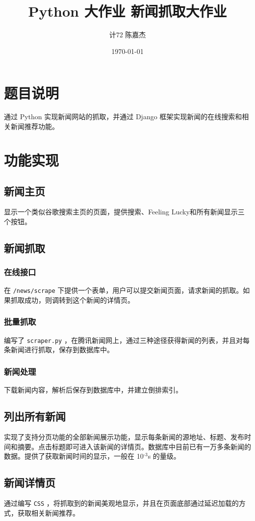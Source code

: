 \documentclass[11pt]{article}
\author{计72 陈嘉杰}
\date{\today}
\title{Python 大作业 新闻抓取大作业}
\begin{document}
\maketitle
\tableofcontents

\section{题目说明}
\label{sec:orga750e06}
通过 Python 实现新闻网站的抓取，并通过 Django 框架实现新闻的在线搜索和相关新闻推荐功能。

\section{功能实现}
\label{sec:orge7c0fa5}
\subsection{新闻主页}
\label{sec:org84926a9}
显示一个类似谷歌搜索主页的页面，提供搜索、Feeling Lucky和所有新闻显示三个按钮。
\subsection{新闻抓取}
\label{sec:org071694a}
\subsubsection{在线接口}
\label{sec:org5a70e2e}
在 \texttt{/news/scrape} 下提供一个表单，用户可以提交新闻页面，请求新闻的抓取。如果抓取成功，则调转到这个新闻的详情页。
\subsubsection{批量抓取}
\label{sec:org731a6b0}
编写了 \texttt{scraper.py} ，在腾讯新闻网上，通过三种途径获得新闻的列表，并且对每条新闻进行抓取，保存到数据库中。
\subsubsection{新闻处理}
\label{sec:orgd0d832f}
下载新闻内容，解析后保存到数据库中，并建立倒排索引。
\subsection{列出所有新闻}
\label{sec:org0e08333}
实现了支持分页功能的全部新闻展示功能，显示每条新闻的源地址、标题、发布时间和摘要。点击标题即可进入该新闻的详情页。数据库中目前已有一万多条新闻的数据。提供了获取新闻时间的显示，一般在 10\(^{\text{-3}}\)s 的量级。
\subsection{新闻详情页}
\label{sec:org9a4ef0c}
通过编写 \texttt{CSS} ，将抓取到的新闻美观地显示，并且在页面底部通过延迟加载的方式，获取相关新闻推荐。
\end{document}
